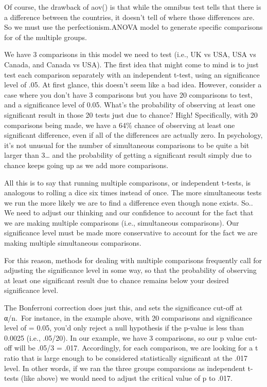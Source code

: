 \documentclass[
]{article}
\begin{document}
Of course, the drawback of aov() is that while the omnibus test tells
that there is a difference between the countries, it doesn't tell of
where those differences are. So we must use the perfectionism.ANOVA
model to generate specific comparisons for of the multiple groups.

We have 3 comparisons in this model we need to test (i.e., UK vs USA,
USA vs Canada, and Canada vs USA). The first idea that might come to
mind is to just test each comparison separately with an independent
t-test, using an significance level of .05. At first glance, this
doesn't seem like a bad idea. However, consider a case where you don't
have 3 comparisons but you have 20 comparisons to test, and a
significance level of 0.05. What's the probability of observing at least
one significant result in those 20 tests just due to chance? High!
Specifically, with 20 comparisons being made, we have a 64\% chance of
observing at least one significant difference, even if all of the
differences are actually zero. In psychology, it's not unusual for the
number of simultaneous comparisons to be quite a bit larger than
3\ldots{} and the probability of getting a significant result simply due
to chance keeps going up as we add more comparisons.

All this is to say that running multiple comparisons, or independent
t-tests, is analogous to rolling a dice six times instead of once. The
more simultaneous tests we run the more likely we are to find a
difference even though none exists. So.. We need to adjust our thinking
and our confidence to account for the fact that we are making multiple
comparisons (i.e., simultaneous comparisons). Our significance level
must be made more conservative to account for the fact we are making
multiple simultaneous comparisons.

For this reason, methods for dealing with multiple comparisons
frequently call for adjusting the significance level in some way, so
that the probability of observing at least one significant result due to
chance remains below your desired significance level.

The Bonferroni correction does just this, and sets the significance
cut-off at α/n.~For instance, in the example above, with 20 comparisons
and significance level of = 0.05, you'd only reject a null hypothesis if
the p-value is less than 0.0025 (i.e., .05/20). In our example, we have
3 comparisons, so our p value cut-off will be .05/3 = .017. Accordingly,
for each comparison, we are looking for a t ratio that is large enough
to be considered statistically significant at the .017 level. In other
words, if we ran the three groups comparsions as independent t-tests
(like above) we would need to adjust the critical value of p to .017.
\end{document}
